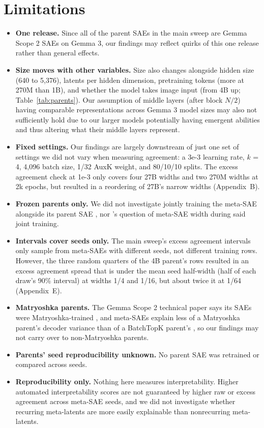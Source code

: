 \section{Limitations}

\begin{itemize}
  \item \textbf{One release.}
    Since all of the parent SAEs in the main sweep are Gemma Scope 2 SAEs on Gemma 3, our findings may reflect quirks of this one release rather than general effects.
  \item \textbf{Size moves with other variables.}
    Size also changes alongside hidden size (640 to 5,376), latents per hidden dimension, pretraining tokens (more at 270M than 1B), and whether the model takes image input (from 4B up; Table~\ref{tab:parents}).
    Our assumption of middle layers (after block $N/2$) having comparable representations across Gemma 3 model sizes may also not sufficiently hold due to our larger models potentially having emergent abilities \citep{wei2022emergent} and thus altering what their middle layers represent.
  \item \textbf{Fixed settings.}
    Our findings are largely downstream of just one set of settings we did not vary when measuring agreement: a 3e-3 learning rate, $k$ = 4, 4,096 batch size, 1/32 AuxK weight, and 80/10/10 splits.
    The excess agreement check at 1e-3 only covers four 27B widths and two 270M widths at 2k epochs, but resulted in a reordering of 27B's narrow widths (Appendix~B).
  \item \textbf{Frozen parents only.}
    We did not investigate jointly training the meta-SAE alongside its parent SAE \citep{levinson2026metasaes,zhao2026saepp}, nor \citeauthor{levinson2026metasaes}'s \citeyearpar{levinson2026metasaes} question of meta-SAE width during said joint training.
  \item \textbf{Intervals cover seeds only.}
    The main sweep's excess agreement intervals only sample from meta-SAEs with different seeds, not different training rows.
    However, the three random quarters of the 4B parent's rows resulted in an excess agreement spread that is under the mean seed half-width (half of each draw's 90\% interval) at widths 1/4 and 1/16, but about twice it at 1/64 (Appendix~E).
  \item \textbf{Matryoshka parents.}
    The Gemma Scope 2 technical paper says its SAEs were Matryoshka-trained \citep{mcdougall2025gemmascope2}, and meta-SAEs explain less of a Matryoshka parent's decoder variance than of a BatchTopK parent's \citep{bussmann2025matryoshka,korznikov2025ortsae}, so our findings may not carry over to non-Matryoshka parents.
  \item \textbf{Parents' seed reproducibility unknown.}
    No parent SAE was retrained or compared across seeds.
  \item \textbf{Reproducibility only.}
    Nothing here measures interpretability.
    Higher automated interpretability scores \citep{paulo2025autointerp} are not guaranteed by higher raw or excess agreement across meta-SAE seeds, and we did not investigate whether recurring meta-latents are more easily explainable than nonrecurring meta-latents.
\end{itemize}

